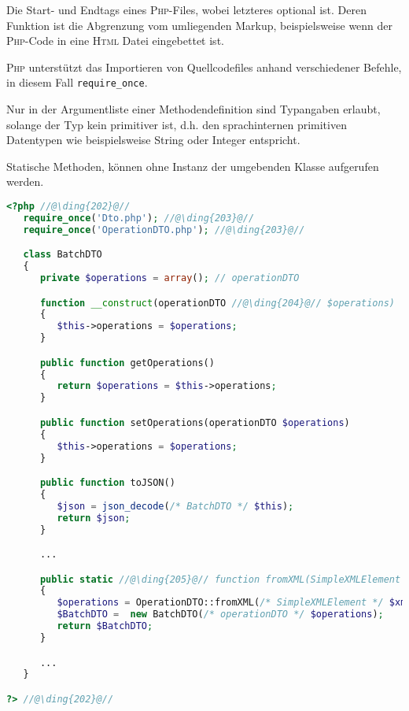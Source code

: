 \begin{compactitem}
    \item[\ding{202}] Die Start- und Endtags eines \textsc{Php}-Files, wobei letzteres optional ist. Deren Funktion ist die Abgrenzung vom umliegenden Markup, beispielsweise wenn der \textsc{Php}-Code in eine \textsc{Html} Datei eingebettet ist.
    \item[\ding{203}] \textsc{Php} unterstützt das Importieren von Quellcodefiles anhand verschiedener Befehle, in diesem Fall \texttt{require\_once}.
    \item[\ding{204}] Nur in der Argumentliste einer Methodendefinition sind Typangaben erlaubt, solange der Typ kein primitiver ist, d.h. den sprachinternen primitiven Datentypen wie beispielsweise String oder Integer entspricht. 
    \item[\ding{205}] Statische Methoden, können ohne Instanz der umgebenden Klasse aufgerufen werden.
\end{compactitem}

\begin{minipage}{\textwidth}
\begin{lstlisting}[language=php, caption=Durch den Generator erzeugte Batch\textsc{DTO} Datenklasse der Spreadshirt-\textsc{API} als Beispiel für eine \textsc{PHP}-Datei]
<?php //@\ding{202}@//
   require_once('Dto.php'); //@\ding{203}@//
   require_once('OperationDTO.php'); //@\ding{203}@//

   class BatchDTO
   {
      private $operations = array(); // operationDTO 

      function __construct(operationDTO //@\ding{204}@// $operations) 
      {
         $this->operations = $operations;
      }

      public function getOperations()
      {
         return $operations = $this->operations;
      }

      public function setOperations(operationDTO $operations)
      {
         $this->operations = $operations;
      }

      public function toJSON()
      {
         $json = json_decode(/* BatchDTO */ $this);
         return $json;
      }

      ...

      public static //@\ding{205}@// function fromXML(SimpleXMLElement $xml)
      {
         $operations = OperationDTO::fromXML(/* SimpleXMLElement */ $xml->operations);
         $BatchDTO =  new BatchDTO(/* operationDTO */ $operations);
         return $BatchDTO;
      }

      ...
   }

?> //@\ding{202}@//
\end{lstlisting}
\end{minipage}

